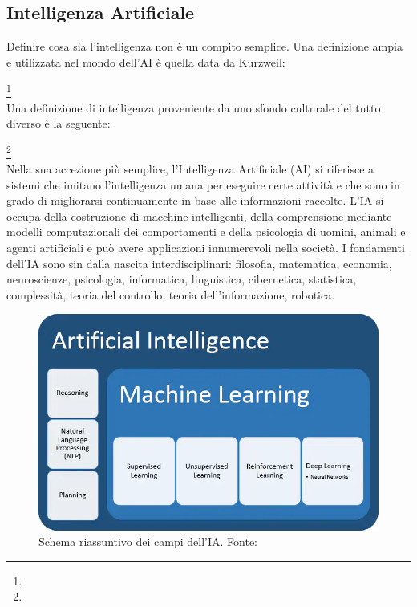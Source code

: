\subsection{Intelligenza Artificiale}

Definire cosa sia l'intelligenza non è un compito semplice. Una definizione ampia e utilizzata nel mondo dell'AI è quella data da Kurzweil:

\footnote{} \\

Una definizione di intelligenza proveniente da uno sfondo culturale del tutto diverso è la seguente:

\footnote{} \\

Nella sua accezione più semplice, l'Intelligenza Artificiale (AI) si riferisce a sistemi che imitano l'intelligenza umana per eseguire certe attività e che sono in grado di migliorarsi continuamente in base alle informazioni raccolte. L'IA si occupa della costruzione di macchine intelligenti, della comprensione mediante modelli computazionali dei comportamenti e della psicologia di uomini, animali e agenti artificiali e può avere applicazioni innumerevoli nella società. I fondamenti dell'IA sono sin dalla nascita interdisciplinari: filosofia, matematica, economia, neuroscienze, psicologia, informatica, linguistica, cibernetica, statistica, complessità, teoria del controllo, teoria dell'informazione, robotica.

\begin{figure}[!h]
	\centering
	\includegraphics[scale=0.4]{images/artificial-intelligence.png}
	\caption{Schema riassuntivo dei campi dell'IA. Fonte: \cite{ML_IBM}}
	\label{fig:ai}
\end{figure}

